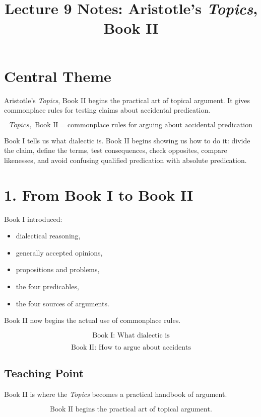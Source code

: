 \documentclass[12pt]{article}
\title{Lecture 9 Notes: Aristotle's \textit{Topics}, Book II}
\author{}
\date{}
\begin{document}
\maketitle

\section*{Central Theme}

Aristotle's \textit{Topics}, Book II begins the practical art of topical
argument. It gives commonplace rules for testing claims about accidental
predication.

\[
\boxed{
\textit{Topics}, \text{ Book II}
=
\text{commonplace rules for arguing about accidental predication}
}
\]

Book I tells us what dialectic is. Book II begins showing us how to do it:
divide the claim, define the terms, test consequences, check opposites, compare
likenesses, and avoid confusing qualified predication with absolute predication.

\section*{1. From Book I to Book II}

Book I introduced:

\begin{itemize}[itemsep=0.25em]
    \item dialectical reasoning,
    \item generally accepted opinions,
    \item propositions and problems,
    \item the four predicables,
    \item the four sources of arguments.
\end{itemize}

Book II now begins the actual use of commonplace rules.

\[
\text{Book I: What dialectic is}
\]

\[
\text{Book II: How to argue about accidents}
\]

\subsection*{Teaching Point}

Book II is where the \textit{Topics} becomes a practical handbook of argument.

\[
\boxed{
\text{Book II begins the practical art of topical argument.}
}
\]
\end{document}

